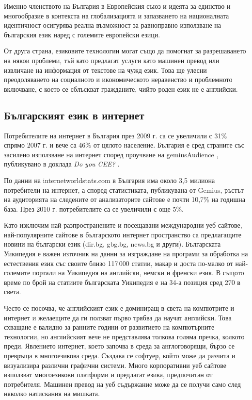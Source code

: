 \begin{multicols}{2}
  Именно членството на България в Европейския съюз и идеята за единство и многообразие в контекста на глобализацията и запазването на националната идентичност осигурява реална възможност за равноправно използване на българския език наред с големите европейски езици. 

  От друга страна, езиковите технологии могат също да помогнат за разрешаването на някои проблеми, тъй като предлагат услуги като машинен превод или извличане на информация от текстове на чужд език. Това ще улесни преодоляването на социалното и икономическото неравенство и проблемното включване, с което се сблъскват гражданите, чийто роден език не е английски.


  \subsection{Българският език в интернет}

  Потребителите на интернет в България през 2009 г. са се увеличили с 31\% спрямо 2007 г. и вече са 46\% от цялото население. България е сред страните със засилено използване на интернет според проучване на gemiusAudience \cite{gemius}, публикувано в доклада \textit{Do you CEE?} \cite{inetcee}.

  По данни на internetworldstats.com \cite{inetworldstat} в България има около 3,5 милиона потребители на интернет, а според статистиката, публикувана от Gemius, ръстът на аудиторията на следените от анализаторите сайтове е почти 10,7\% на годишна база. През 2010 г. потребителите са се увеличили с още 5\%. 

  Като изключим най-разпространените и посещавани международни уеб сайтове, най-популярните сайтове в българското интернет пространство са предлагащите новини на български език (dir.bg, gbg.bg, news.bg и други). Българската Уикипедия е важен източник на данни за изграждане на програми за обработка на естествения език със своите близо 117\,000 статии, макар и доста по-малко от най-големите портали на Уикипедия на английски, немски и френски език. В същото време по брой на статиите българската Уикипедия е на 34-а \cite{metadata} позиция сред 270 в света. 

  Често се посочва, че английският език е доминиращ в света на компютрите и интернет и желаещите да ги ползват първо трябва да научат английски. Това схващане е валидно  за ранните години от развитието на компютърните технологии, но английският вече не представлява толкова голяма пречка, колкото преди. Явлението интернет, което започва в среда за англоговорящи, бързо се превръща в многоезикова среда. Създава се софтуер, който може да разчита и визуализира различни графични системи. Много корпоративни уеб сайтове използват многоезикови платформи и предлагат езика, предпочитан от потребителя. Машинен превод на уеб съдържание може да се получи само след няколко натискания на мишката.


\end{multicols}
